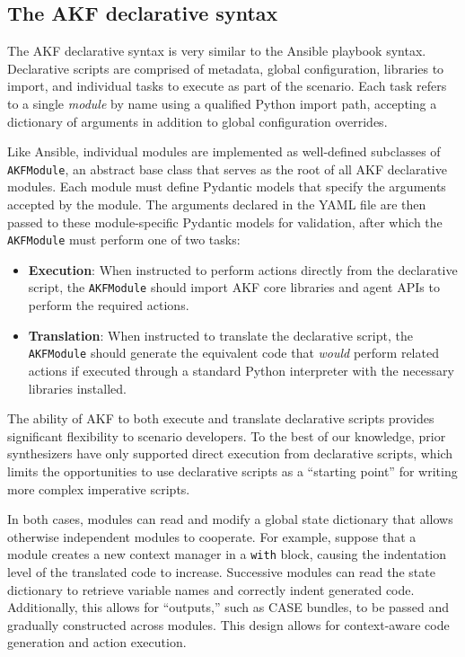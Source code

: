\documentclass[letterpaper,12pt]{report}
\def\tightlist{}
\newcommand{\passthrough}[1]{#1}
\begin{document}
\subsection{The AKF declarative
syntax}\label{the-akf-declarative-syntax}

The AKF declarative syntax is very similar to the Ansible playbook
syntax. Declarative scripts are comprised of metadata, global
configuration, libraries to import, and individual tasks to execute as
part of the scenario. Each task refers to a single \emph{module} by name
using a qualified Python import path, accepting a dictionary of
arguments in addition to global configuration overrides.

Like Ansible, individual modules are implemented as well-defined
subclasses of \passthrough{\lstinline!AKFModule!}, an abstract base
class that serves as the root of all AKF declarative modules. Each
module must define Pydantic models that specify the arguments accepted
by the module. The arguments declared in the YAML file are then passed
to these module-specific Pydantic models for validation, after which the
\passthrough{\lstinline!AKFModule!} must perform one of two tasks:

\begin{itemize}
\tightlist
\item
  \textbf{Execution}: When instructed to perform actions directly from
  the declarative script, the \passthrough{\lstinline!AKFModule!} should
  import AKF core libraries and agent APIs to perform the required
  actions.
\item
  \textbf{Translation}: When instructed to translate the declarative
  script, the \passthrough{\lstinline!AKFModule!} should generate the
  equivalent code that \emph{would} perform related actions if executed
  through a standard Python interpreter with the necessary libraries
  installed.
\end{itemize}

The ability of AKF to both execute and translate declarative scripts
provides significant flexibility to scenario developers. To the best of
our knowledge, prior synthesizers have only supported direct execution
from declarative scripts, which limits the opportunities to use
declarative scripts as a ``starting point'' for writing more complex
imperative scripts.

In both cases, modules can read and modify a global state dictionary
that allows otherwise independent modules to cooperate. For example,
suppose that a module creates a new context manager in a
\passthrough{\lstinline!with!} block, causing the indentation level of
the translated code to increase. Successive modules can read the state
dictionary to retrieve variable names and correctly indent generated
code. Additionally, this allows for ``outputs,'' such as CASE bundles,
to be passed and gradually constructed across modules. This design
allows for context-aware code generation and action execution.
\end{document}

